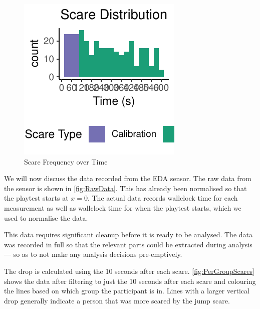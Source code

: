 \documentclass[12pt,a4paper]{article}\usepackage[]{graphicx}\usepackage[]{color}
\makeatletter
\def\maxwidth{ %
  \ifdim\Gin@nat@width>\linewidth
    \linewidth
  \else
    \Gin@nat@width
  \fi
}
\makeatother
\begin{document}
\begin{figure}[htb]


{\centering \includegraphics[width=\maxwidth]{figure/ScareHistogram-1} 

}



\caption{Scare Frequency over Time}
\label{fig:ScareHistogram}
\end{figure}

We will now discuss the data recorded from the EDA sensor.
The raw data from the sensor is shown in \vref{fig:RawData}.
This has already been normalised so that the playtest starts at $x=0$.
The actual data records wallclock time for each measurement as well as wallclock time for when the playtest starts, which we used to normalise the data.

This data requires significant cleanup before it is ready to be analysed.
The data was recorded in full so that the relevant parts could be extracted during analysis --- so as to not make any analysis decisions pre-emptively.

The drop is calculated using the 10 seconds after each scare.
\vref{fig:PerGroupScares} shows the data after filtering to just the 10 seconds after each scare and colouring the lines based on which group the participant is in.
Lines with a larger vertical drop generally indicate a person that was more scared by the jump scare.
\end{document}
